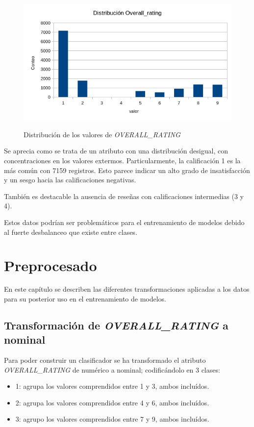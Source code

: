 \documentclass[es]{uc3mreport}
\begin{document}
\begin{report}
\begin{figure}[H]
    \center
    \includegraphics[width=0.85\linewidth]{distribucion_overall.png}\\
    \caption{Distribución de los valores de \textit{OVERALL\_RATING}}
    \label{distribucion-overall}
\end{figure}

Se aprecia como se trata de un atributo con una distribución desigual, con
concentraciones en los valores extermos. Particularmente, la calificación 1 es
la más común con 7159 registros. Esto parece indicar un alto grado de
insatisfacción y un sesgo hacia las calificaciones negativas.

También es destacable la ausencia de reseñas con calificaciones intermedias (3 y
4).

Estos datos podrían ser problemáticos para el entrenamiento de modelos debido al
fuerte desbalanceo que existe entre clases.

\section{Preprocesado}
\label{chap:preprocess}
En este capítulo se describen las diferentes transformaciones aplicadas a los datos para su posterior uso en el entrenamiento de modelos.

\subsection{Transformación de \textit{OVERALL\_RATING} a nominal}
\label{sec:overalltransform}
Para poder construir un clasificador se ha transformado el atributo \textit{OVERALL\_RATING} de numérico a nominal; codificándolo en 3 clases:
\begin{itemize}
    \item 1: agrupa los valores comprendidos entre 1 y 3, ambos incluídos.
    \item 2: agrupa los valores comprendidos entre 4 y 6, ambos incluídos.
    \item 3: agrupo los valores comprendidos entre 7 y 9, ambos incluídos.
\end{itemize}


\end{report}
\end{document}
